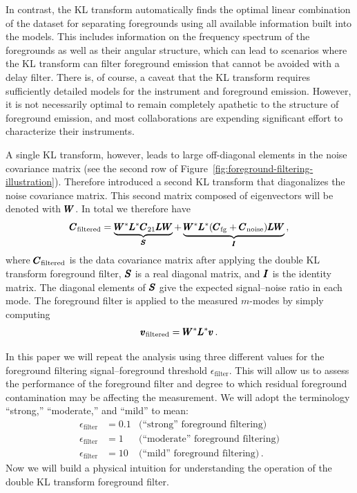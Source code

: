 \begin{bibunit}
In contrast, the KL transform automatically finds the optimal linear combination of the dataset for
separating foregrounds using all available information built into the models. This includes
information on the frequency spectrum of the foregrounds as well as their angular structure, which
can lead to scenarios where the KL transform can filter foreground emission that cannot be avoided
with a delay filter. There is, of course, a caveat that the KL transform requires sufficiently
detailed models for the instrument and foreground emission. However, it is not necessarily optimal
to remain completely apathetic to the structure of foreground emission, and most collaborations are
expending significant effort to characterize their instruments.

A single KL transform, however, leads to large off-diagonal elements in the noise covariance matrix
(see the second row of Figure~\ref{fig:foreground-filtering-illustration}). Therefore
\citet{2014ApJ...781...57S,2015PhRvD..91h3514S} introduced a second KL transform that diagonalizes
the noise covariance matrix. This second matrix composed of eigenvectors will be denoted with $\pmb
W$. In total we therefore have
\begin{equation}
    \pmb C_\text{filtered}
        = \underbrace{\pmb W^*\pmb L^*\pmb C_\text{21}\pmb L\pmb W}_{\pmb S}
        + \underbrace{\pmb W^*\pmb L^*(\pmb C_\text{fg} + \pmb C_\text{noise})\pmb L\pmb W}_{\pmb I}\,,
\end{equation}
where $\pmb C_\text{filtered}$ is the data covariance matrix after applying the double KL transform
foreground filter, $\pmb S$ is a real diagonal matrix, and $\pmb I$ is the identity matrix. The diagonal
elements of $\pmb S$ give the expected signal--noise ratio in each mode.  The foreground filter is
applied to the measured $m$-modes by simply computing
\begin{equation}
    \pmb v_\text{filtered} = \pmb W^*\pmb L^*\pmb v\,.
\end{equation}

In this paper we will repeat the analysis using three different values for the foreground filtering
signal--foreground threshold $\epsilon_\text{filter}$. This will allow us to assess the performance
of the foreground filter and degree to which residual foreground contamination may be affecting the
measurement. We will adopt the terminology ``strong,'' ``moderate,'' and ``mild'' to mean:
\begin{align*}
    \epsilon_\text{filter} &= 0.1 & \text{(``strong'' foreground filtering)} \\
    \epsilon_\text{filter} &= 1   & \text{(``moderate'' foreground filtering)} \\
    \epsilon_\text{filter} &= 10  & \text{(``mild'' foreground filtering)}\,.
\end{align*}
Now we will build a physical intuition for understanding the operation of the double KL transform
foreground filter.


\end{bibunit}
